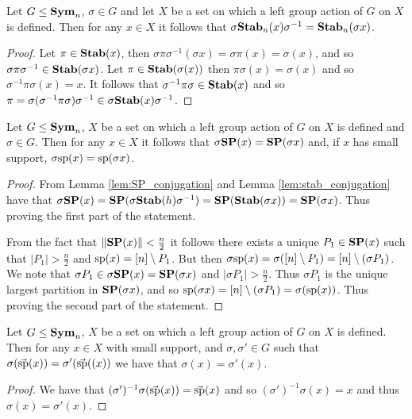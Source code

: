 \documentclass[../paper.tex]{subfiles}
\begin{document}
\begin{lem}
  \label{lem:stab_conjugation}
  Let $G \leq \text{\textbf{Sym}}_n$, $\sigma \in G$ and let $X$ be a set on which a left group
  action of $G$ on $X$ is defined. Then for any $x \in X$ it follows that
  $\sigma \text{\textbf{Stab}}_n (x) \sigma^{-1} = \text{\textbf{Stab}}_n(\sigma x)$.
\end{lem}

\begin{proof}
  Let $\pi \in \text{\textbf{Stab}}(x)$, then $\sigma \pi \sigma^{-1}(\sigma x) = \sigma \pi
  (x) = \sigma (x)$, and so $\sigma \pi \sigma^{-1} \in \text{\textbf{Stab}}(\sigma x)$. Let
  $\pi \in \text{\textbf{Stab}}(\sigma (x))$ then $\pi \sigma (x) = \sigma (x)$ and so
  $\sigma^{-1} \pi \sigma (x) = x$. It follows that $\sigma^{-1} \pi \sigma \in
  \text{\textbf{Stab}}(x)$ and so $\pi = \sigma (\sigma^{-1} \pi \sigma) \sigma ^{-1} \in
  \sigma \text{\textbf{Stab}}(x) \sigma^{-1}$.
\end{proof}

\begin{lem}
  \label{lem:support_mapping}
  Let $G \leq \text{\textbf{Sym}}_n$, $X$ be a set on which a left group action of $G$ on $X$
  is defined and $\sigma \in G$. Then for any $x \in X$ it follows that $\sigma
  \text{\textbf{SP}} (x) = \text{\textbf{SP}} (\sigma x)$ and, if $x$ has small support, $\sigma \text{sp} (x) =
  \text{sp} (\sigma x)$.
\end{lem}
\begin{proof}
  From Lemma \ref{lem:SP_conjugation} and Lemma \ref{lem:stab_conjugation} have
  that $\sigma \text{\textbf{SP}} (x) = \text{\textbf{SP}}(\sigma \text{\textbf{Stab}}(h) \sigma^{-1}) = \text{\textbf{SP}} (\text{\textbf{Stab}}(\sigma
  x)) = \text{\textbf{SP}} (\sigma x)$. Thus proving the first part of the statement.

  From the fact that $\| \text{\textbf{SP}}(x) \| < \frac{n}{2}$ it follows there exists a
  unique $P_1 \in \text{\textbf{SP}}(x)$ such that $\vert P_1 \vert > \frac{n}{2}$ and
  $\text{sp}(x) = [n] \setminus P_1$. But then $\sigma \text{sp} (x) = \sigma([n]
  \setminus P_1) = [n] \setminus (\sigma P_1)$. We note that $\sigma P_1 \in
  \sigma \text{\textbf{SP}} (x) = \text{\textbf{SP}}(\sigma x)$ and $\vert \sigma P_1 \vert > \frac{n}{2}$.
  Thus $\sigma P_1$ is the unique largest partition in $\text{\textbf{SP}}(\sigma x)$, and so
  $\text{sp}(\sigma x) = [n]\setminus (\sigma P_1) = \sigma (\text{sp}(x))$. Thus
  proving the second part of the statement.
\end{proof}

\begin{lem}
  Let $G \leq \text{\textbf{Sym}}_n$, $X$ be a set on which a left group action of $G$ on $X$
  is defined. Then for any $x \in X$ with small support, and $\sigma, \sigma'
  \in G$ such that $\sigma (\vec{\text{sp}}(x)) = \sigma' (\vec{\text{sp}}((x))$ we
  have that $\sigma (x) = \sigma'(x)$.
  \label{lem:support-determine-action}
\end{lem}
\begin{proof}
  We have that $(\sigma')^{-1}\sigma(\vec{\text{sp}}(x)) = \vec{\text{sp}}(x)$ and so
  $(\sigma')^{-1} \sigma (x) = x$ and thus $\sigma (x) = \sigma' (x)$.
\end{proof}
\end{document}
